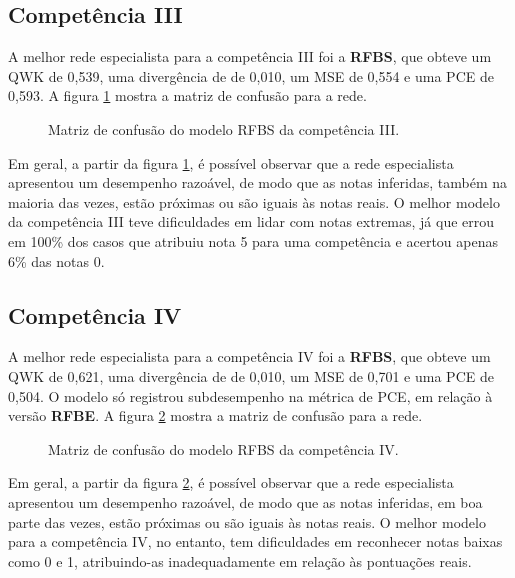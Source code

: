 \subsection{Competência III}
\label{subsec:eval-c3}

A melhor rede especialista para a competência III foi a \textbf{RFBS}, que obteve um QWK de 0,539, uma divergência de de 0,010, um MSE de 0,554 e uma PCE de 0,593. A figura \ref{fig:eval-c3-confusion-matrix} mostra a matriz de confusão para a rede.

\begin{figure}[H]
    \centering
    \resizebox{0.5\textwidth}{!}{}
    \caption{Matriz de confusão do modelo RFBS da competência III.}
    \label{fig:eval-c3-confusion-matrix}
\end{figure}

Em geral, a partir da figura \ref{fig:eval-c3-confusion-matrix}, é possível observar que a rede especialista apresentou um desempenho razoável, de modo que as notas inferidas, também na maioria das vezes, estão próximas ou são iguais às notas reais. O melhor modelo da competência III teve dificuldades em lidar com notas extremas, já que errou em 100\% dos casos que atribuiu nota 5 para uma competência e acertou apenas 6\% das notas 0.

\subsection{Competência IV}
\label{subsec:eval-c4}

A melhor rede especialista para a competência IV foi a \textbf{RFBS}, que obteve um QWK de 0,621, uma divergência de de 0,010, um MSE de 0,701 e uma PCE de 0,504. O modelo só registrou subdesempenho na métrica de PCE, em relação à versão \textbf{RFBE}. A figura \ref{fig:eval-c4-confusion-matrix} mostra a matriz de confusão para a rede.

\begin{figure}[H]
    \centering
    \resizebox{0.5\textwidth}{!}{}
    \caption{Matriz de confusão do modelo RFBS da competência IV.}
    \label{fig:eval-c4-confusion-matrix}
\end{figure}

Em geral, a partir da figura \ref{fig:eval-c4-confusion-matrix}, é possível observar que a rede especialista apresentou um desempenho razoável, de modo que as notas inferidas, em boa parte das vezes, estão próximas ou são iguais às notas reais. O melhor modelo para a competência IV, no entanto, tem dificuldades em reconhecer notas baixas como 0 e 1, atribuindo-as inadequadamente em relação às pontuações reais.

